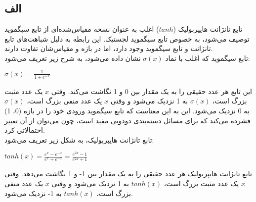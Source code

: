 \documentclass{article}
\begin{document}
\section{}
\subsection{الف}
تابع تانژانت هایپربولیک ($tanh$) اغلب به عنوان نسخه مقیاس‌شده‌ای از تابع سیگموید توصیف می‌شود، به خصوص تابع سیگموید لجستیک. این رابطه به دلیل شباهت‌های تابع تانژانت و تابع سیگموید وجود دارد، اما در بازه و مقیاس‌شان تفاوت دارند.\\
تابع سیگموید که اغلب با نماد $\sigma\left( x \right)$ نشان داده می‌شود، به شرح زیر تعریف می‌شود:
\begin{latin}
$
\sigma\left( x \right) = \frac{1}{1 + e ^ {-x}}
$
\end{latin}
این تابع هر عدد حقیقی را به یک مقدار بین 0 و 1 نگاشت می‌کند. وقتی $x$ یک عدد مثبت بزرگ است، $\sigma\left( x \right)$ به 1 نزدیک می‌شود و وقتی $x$ یک عدد منفی بزرگ است، $\sigma\left( x \right)$ به 0 نزدیک می‌شود. این به این معناست که تابع سیگموید ورودی خود را در بازه (0، 1) فشرده می‌کند که برای مسائل دسته‌بندی دودویی مفید است، چون می‌توان از آن تعبیر احتمالاتی کرد.\\
تابع تانژانت هایپربولیک، به شکل زیر تعریف می‌شود:
\begin{latin}
$
tanh(x) = \frac{e^x - e^{-x}}{e^x + e^{-x}} = \frac{e ^ {2x} - 1}{e ^ {2x} + 1}
$
\end{latin}
تابع تانژانت هایپربولیک هر عدد حقیقی را به یک مقدار بین 1- و 1 نگاشت می‌دهد. وقتی $x$ یک عدد مثبت بزرگ است، $tanh(x)$ به 1 نزدیک می‌شود و وقتی $x$ یک عدد منفی بزرگ است، $tanh(x)$ به 1- نزدیک می‌شود.\\
\end{document}
